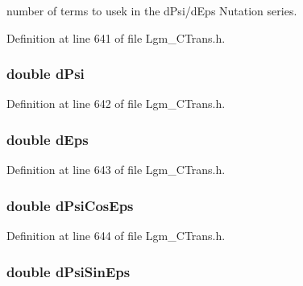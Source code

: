 number of terms to usek in the dPsi/dEps Nutation series. 



Definition at line 641 of file Lgm\_\-CTrans.h.\hypertarget{struct_lgm___c_trans_bdbb574b7039f3276386228756be3072}{
\subsubsection[{dPsi}]{\setlength{\rightskip}{0pt plus 5cm}double {\bf dPsi}}}
\label{struct_lgm___c_trans_bdbb574b7039f3276386228756be3072}




Definition at line 642 of file Lgm\_\-CTrans.h.\hypertarget{struct_lgm___c_trans_da0088f7b27e9da12e8e3bf8e9cf61b7}{
\subsubsection[{dEps}]{\setlength{\rightskip}{0pt plus 5cm}double {\bf dEps}}}
\label{struct_lgm___c_trans_da0088f7b27e9da12e8e3bf8e9cf61b7}




Definition at line 643 of file Lgm\_\-CTrans.h.\hypertarget{struct_lgm___c_trans_294c5492f2739575636f91a5170f9b19}{
\subsubsection[{dPsiCosEps}]{\setlength{\rightskip}{0pt plus 5cm}double {\bf dPsiCosEps}}}
\label{struct_lgm___c_trans_294c5492f2739575636f91a5170f9b19}




Definition at line 644 of file Lgm\_\-CTrans.h.\hypertarget{struct_lgm___c_trans_693724f063518972e1b52489e9b950b6}{
\subsubsection[{dPsiSinEps}]{\setlength{\rightskip}{0pt plus 5cm}double {\bf dPsiSinEps}}}
\label{struct_lgm___c_trans_693724f063518972e1b52489e9b950b6}




